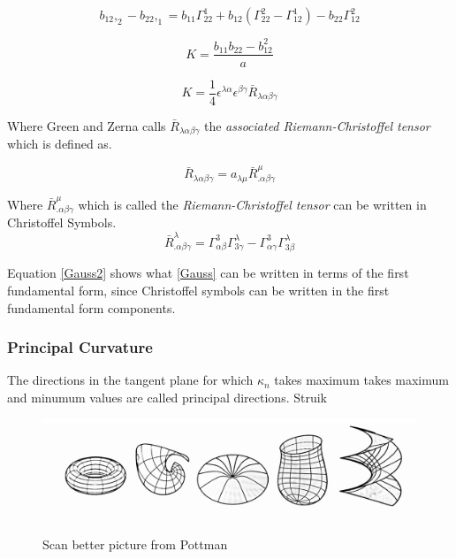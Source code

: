 \begin{equation}
   b_{12},_2 - b_{22},_1 = b_{11} \Gamma^1_{22} + b_{12}(\Gamma^2_{22} - \Gamma^1_{12}) - b_{22}\Gamma^2_{12} 
\end{equation}


\begin{equation}\label{Gauss}
  K= \frac{b_{11}b_{22}-b^2_{12}}{a}
\end{equation}

\begin{equation}
  K= \frac{1}{4}\epsilon^{\lambda \alpha} \epsilon^{\beta \gamma} \bar{R}_{\lambda \alpha \beta \gamma}
\end{equation}

Where Green and Zerna calls $\bar{R}_{\lambda \alpha \beta \gamma}$ the  \textit{associated Riemann-Christoffel tensor} which is defined as.

\begin{equation}
 \bar{R}_{\lambda \alpha \beta \gamma} = a_{\lambda \mu} \bar{R}^\mu_{.\alpha \beta \gamma}
\end{equation}

 Where $\bar{R}^\mu_{.\alpha \beta \gamma}$ which is called the \textit{Riemann-Christoffel tensor} can be written in Christoffel Symbols.
\begin{equation} \label{Gauss2}
\bar{R}^\lambda_{.\alpha \beta \gamma} = \Gamma^3_{\alpha \beta} \Gamma^\lambda_{3\gamma}-\Gamma^3_{\alpha \gamma}\Gamma^\lambda_{3\beta} 
\end{equation}

Equation \ref{Gauss2} shows what \ref{Gauss} can be written in terms of the first fundamental form, since Christoffel symbols can be written in the first fundamental form components.


\subsubsection{Principal Curvature}

The directions in the tangent plane for which $\kappa_n$ takes maximum takes maximum and minumum values are called principal directions. Struik


\begin{figure}[H]
\centering
\includegraphics[width = 0.9\linewidth ]{figure/Theory/principalCurvature.pdf}
\caption{Scan better picture from Pottman }
\end{figure}


